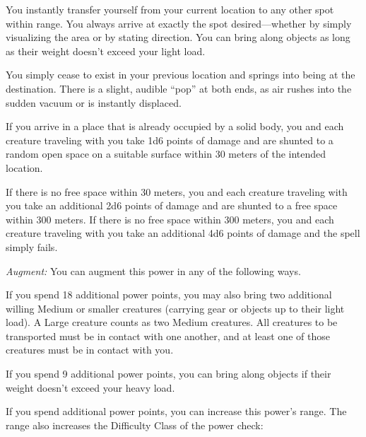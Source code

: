 {
	You instantly transfer yourself from your current location to any other spot within range. You always arrive at exactly the spot desired---whether by simply visualizing the area or by stating direction. You can bring along objects as long as their weight doesn't exceed your light load.

	You simply cease to exist in your previous location and springs into being at the destination. There is a slight, audible ``pop'' at both ends, as air rushes into the sudden vacuum or is instantly displaced.

	If you arrive in a place that is already occupied by a solid body, you and each creature traveling with you take 1d6 points of damage and are shunted to a random open space on a suitable surface within 30 meters of the intended location.

	If there is no free space within 30 meters, you and each creature traveling with you take an additional 2d6 points of damage and are shunted to a free space within 300 meters. If there is no free space within 300 meters, you and each creature traveling with you take an additional 4d6 points of damage and the spell simply fails.

	\textit{Augment:} You can augment this power in any of the following ways.
	\begin{enumerate*}
	\item If you spend 18 additional power points, you may also bring two additional willing Medium or smaller creatures (carrying gear or objects up to their light load). A Large creature counts as two Medium creatures. All creatures to be transported must be in contact with one another, and at least one of those creatures must be in contact with you.
	\item If you spend 9 additional power points, you can bring along objects if their weight doesn't exceed your heavy load.
	\item If you spend additional power points, you can increase this power's range. The range also increases the Difficulty Class of the power check: 
	\end{enumerate*}


}